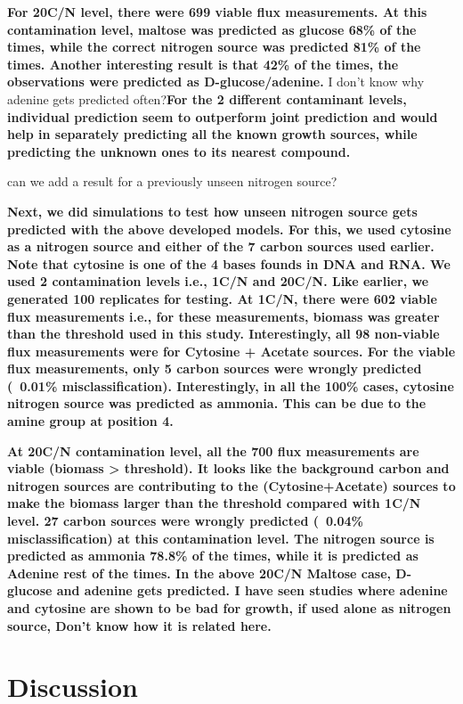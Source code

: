 \documentclass[12pt]{article}
\begin{document}
\textbf{For 20C/N level, there were 699 viable flux measurements. At this contamination level, maltose was predicted as glucose 68\% of the times, while the correct nitrogen source was predicted 81\% of the times. Another interesting result is that 42\% of the times, the observations were predicted as D-glucose/adenine.} {\color{red} I don't know why adenine gets predicted often?}\textbf{For the 2 different contaminant levels, individual prediction seem to outperform joint prediction and would help in separately predicting all the known growth sources, while predicting the unknown ones to its nearest compound.}


{\color{red}can we add a result for a previously unseen nitrogen source?}

\textbf{Next, we did simulations to test how unseen nitrogen source gets predicted with the above developed models. For this, we used cytosine as a nitrogen source and either of the 7 carbon sources used earlier. Note that cytosine is one of the 4 bases founds in DNA and RNA. We used 2 contamination levels i.e., 1C/N and 20C/N. Like earlier, we generated 100 replicates for testing. At 1C/N, there were 602 viable flux measurements i.e., for these measurements, biomass was greater than the threshold used in this study. Interestingly, all 98 non-viable flux measurements were for Cytosine + Acetate sources. For the viable flux measurements, only 5 carbon sources were wrongly predicted (~0.01\% misclassification). Interestingly, in all the 100\% cases, cytosine nitrogen source was predicted as ammonia. This can be due to the amine group at position 4.}

\textbf{At 20C/N contamination level, all the 700 flux measurements are viable (biomass > threshold). It looks like the background carbon and nitrogen sources are contributing to the (Cytosine+Acetate) sources to make the biomass larger than the threshold compared with 1C/N level. 27 carbon sources were wrongly predicted (~0.04\% misclassification) at this contamination level. The nitrogen source is predicted as ammonia 78.8\% of the times, while it is predicted as Adenine rest of the times. {\color{red} In the above 20C/N Maltose case, D-glucose and adenine gets predicted. I have seen studies where adenine and cytosine are shown to be bad for growth, if used alone as nitrogen source, Don't know how it is related here.}}

\section*{Discussion}
\end{document}
